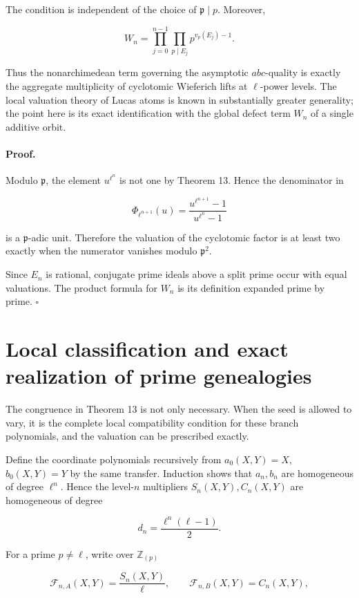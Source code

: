 \documentclass[11pt]{article}
\begin{document}
The condition is independent of the choice of \(\mathfrak p\mid p\).
Moreover,

\[
W_n
=
\prod_{j=0}^{n-1}
\prod_{p\mid E_j}
p^{v_p(E_j)-1}.
\]

Thus the nonarchimedean term governing the asymptotic \(abc\)-quality is
exactly the aggregate multiplicity of cyclotomic Wieferich lifts at
\(\ell\)-power levels. The local valuation theory of Lucas atoms is known
in substantially greater generality; the point here is its exact
identification with the global defect term \(W_n\) of a single additive
orbit.

\paragraph{Proof.}

Modulo \(\mathfrak p\), the element \(u^{\ell^n}\) is not one by
Theorem 13. Hence the denominator in

\[
\Phi_{\ell^{n+1}}(u)
=
\frac{u^{\ell^{n+1}}-1}
{u^{\ell^n}-1}
\]

is a \(\mathfrak p\)-adic unit. Therefore the valuation of the cyclotomic
factor is at least two exactly when the numerator vanishes modulo
\(\mathfrak p^2\).

Since \(E_n\) is rational, conjugate prime ideals above a split prime occur
with equal valuations. The product formula for \(W_n\) is its definition
expanded prime by prime. \(\square\)

\section{Local classification and exact realization of prime genealogies}

The congruence in Theorem 13 is not only necessary. When the seed is
allowed to vary, it is the complete local compatibility condition for these
branch polynomials, and the valuation can be prescribed exactly.

Define the coordinate polynomials recursively from
\(a_0(X,Y)=X\), \(b_0(X,Y)=Y\) by the same transfer. Induction shows that
\(a_n,b_n\) are homogeneous of degree \(\ell^n\). Hence the level-\(n\)
multipliers \(S_n(X,Y),C_n(X,Y)\) are homogeneous of degree

\[
d_n=\frac{\ell^n(\ell-1)}2.
\]

For a prime \(p\ne\ell\), write over \(\mathbb Z_{(p)}\)

\[
\mathcal F_{n,A}(X,Y)
=
\frac{S_n(X,Y)}{\ell},
\qquad
\mathcal F_{n,B}(X,Y)
=
C_n(X,Y),
\]
\end{document}
